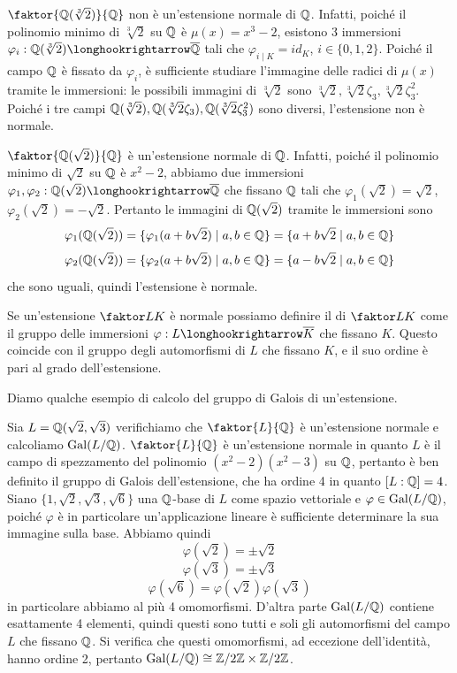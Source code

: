 \documentclass[11pt]{scrartcl}
\begin{document}
	\begin{example}
		$\faktor{\QQ(\sqrt[3]{2})}{\QQ}$ non è un'estensione normale di $\mathbb Q$.
		Infatti, poiché il polinomio minimo di $\sqrt[3]{2}$ su $\mathbb Q$ è $\mu(x) = x^3 - 2$,
		esistono 3 immersioni $\varphi_i: \QQ(\sqrt[3]{2})\longhookrightarrow \ol\QQ$
		tali che $\varphi_{i\mid K} = id_K$, $i \in \{0, 1, 2\}$. Poiché il campo
		$\mathbb Q$ è fissato da $\varphi_i$, è sufficiente studiare l'immagine delle
		radici di $\mu(x)$ tramite le immersioni: le possibili immagini di $\sqrt[3]{2}$
		sono $\sqrt[3]{2}, \sqrt[3]{2}\zeta_3, \sqrt[3]{2}\zeta_3^2$. Poiché i 
		tre campi $\mathbb Q(\sqrt[3]{2}), \mathbb Q(\sqrt[3]{2}\zeta_3), \mathbb Q(\sqrt[3]{2}\zeta_3^2)$
		sono diversi, l'estensione non è normale.
	\end{example}
	
	\begin{example}
		$\faktor{\QQ(\sqrt{2})}{\QQ}$ è un'estensione normale di $\mathbb Q$. Infatti,
		poiché il polinomio minimo di $\sqrt{2}$ su $\mathbb Q$ è $x^2 - 2$, abbiamo 
		due immersioni $\varphi_1, \varphi_2:\QQ(\sqrt{2})\longhookrightarrow \ol\QQ$
		che fissano $\mathbb Q$ tali che $\varphi_1(\sqrt{2}) = \sqrt{2}$, 
		$\varphi_2(\sqrt{2}) = -\sqrt{2}$. Pertanto le immagini di $\mathbb Q(\sqrt 2)$
		tramite le immersioni sono
		\[
		\varphi_1(\mathbb Q(\sqrt 2)) = \{\varphi_1(a + b\sqrt 2)\mid a, b \in \mathbb Q\} = 
		\{a + b\sqrt 2\mid a, b \in \mathbb Q\}
		\]
		\[
		\varphi_2(\mathbb Q(\sqrt 2)) = \{\varphi_2(a + b\sqrt 2)\mid a, b \in \mathbb Q\} = 
		\{a - b\sqrt 2 \mid a, b \in \mathbb Q\}
		\]
		che sono uguali, quindi l'estensione è normale.
	\end{example}
	
	Se un'estensione $\faktor L K$ è normale possiamo definire il 
	di $\faktor L K$ come il gruppo delle immersioni $\varphi:L\longhookrightarrow \ol{K}$
	che fissano $K$. Questo coincide con il gruppo degli automorfismi di $L$
	che fissano $K$, e il suo ordine è pari al grado dell'estensione.
	
	Diamo qualche esempio di calcolo del gruppo di Galois di un'estensione.
	
	\begin{example}
		Sia $L = \mathbb Q(\sqrt 2, \sqrt 3)$ verifichiamo che $\faktor{L}{\QQ}$ è un'estensione 
		normale e calcoliamo $\operatorname{Gal}(L/\mathbb Q)$. $\faktor{L}{\QQ}$ è un'estensione 
		normale in quanto $L$ è il campo di spezzamento del polinomio $(x^2 - 2)(x^2 - 3)$
		su $\mathbb Q$, pertanto è ben definito il gruppo di Galois dell'estensione, 
		che ha ordine 4 in quanto $[L: \mathbb Q] = 4$. Siano $\{1, \sqrt 2, \sqrt 3, \sqrt 6\}$
		una $\mathbb Q$-base di $L$ come spazio vettoriale e $\varphi \in \operatorname{Gal}(L/\mathbb Q)$,
		poiché $\varphi$ è in particolare un'applicazione lineare è sufficiente
		determinare la sua immagine sulla base. Abbiamo quindi
		\[
		\varphi(\sqrt 2) = \pm\sqrt 2
		\]
		\[
		\varphi(\sqrt 3) = \pm \sqrt 3
		\]
		\[
		\varphi(\sqrt 6) = \varphi(\sqrt 2)\varphi(\sqrt 3)
		\]
		in particolare abbiamo al più 4 omomorfismi. D'altra parte $\operatorname{Gal}(L/\mathbb Q)$
		contiene esattamente 4 elementi, quindi questi sono tutti e soli gli automorfismi
		del campo $L$ che fissano $\mathbb Q$. Si verifica che questi omomorfismi, ad 
		eccezione dell'identità, hanno ordine 2, pertanto $\operatorname{Gal}(L/\mathbb Q) \cong \mathbb{Z}/{2}\mathbb{Z}\times\mathbb{Z}/{2}\mathbb{Z}$.
	\end{example}
	
\end{document}
